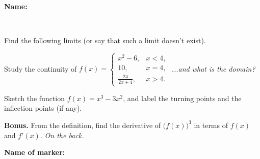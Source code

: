 \documentclass[9pt]{exam}
\begin{document}
\textbf{Name:} \dotfill

\

\begin{questions}

\question[5] Find the following limits (or say that such a limit doesn't exist).


\question[4] Study the continuity of 
$f(x) = \left\{ \begin{array}{cc} x^2 - 6,& x < 4,  \\ 
10, & x = 4, \\
\tfrac{24}{2x + 4},  & x > 4.
\end{array} \right.$ \hfill \emph{...and what is the domain?}
\fillwithdottedlines{48mm}
\vfill


\question[5] Sketch the function $f(x) = x^3 - 3x^2$, and label the turning points and the inflection points (if any).

\begin{minipage}[t]{0.6\textwidth}
\fillwithdottedlines{48mm}
\end{minipage}
\hfill
\begin{minipage}[t]{0.3\textwidth}
\vspace{6mm}
\end{minipage}


\vfill

\question[0] \textbf{Bonus.} From the definition, find the derivative of $\big(f(x)\big)^3$ in terms of $f(x)$ and $f'(x)$. \hfill \emph{On the back.}

\end{questions}


\begin{tcolorbox}

\textbf{Name of marker:}

\begin{center}
\gradetable[h][questions]
\end{center}

\end{tcolorbox}
\end{document}
